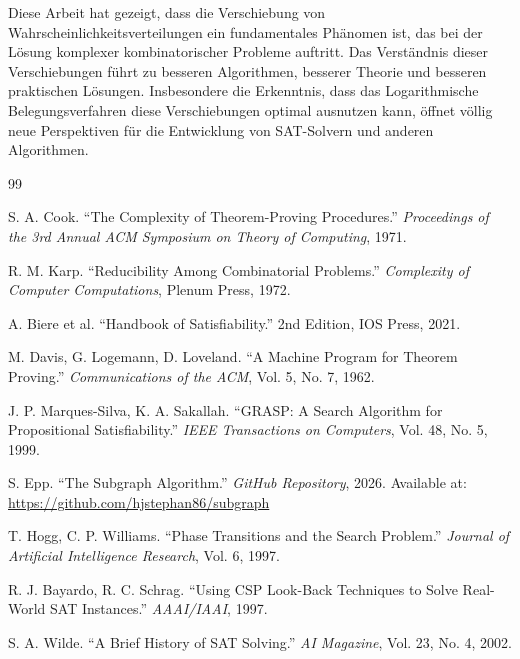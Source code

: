 ﻿\documentclass[a4paper,12pt]{article}
\theoremstyle{definition}
\begin{document}
Diese Arbeit hat gezeigt, dass die Verschiebung von Wahrscheinlichkeitsverteilungen ein fundamentales Phänomen ist, das bei der Lösung komplexer kombinatorischer Probleme auftritt. Das Verständnis dieser Verschiebungen führt zu besseren Algorithmen, besserer Theorie und besseren praktischen Lösungen. Insbesondere die Erkenntnis, dass das Logarithmische Belegungsverfahren diese Verschiebungen optimal ausnutzen kann, öffnet völlig neue Perspektiven für die Entwicklung von SAT-Solvern und anderen Algorithmen.

\begin{thebibliography}{99}

 S. A. Cook. ``The Complexity of Theorem-Proving Procedures.'' \textit{Proceedings of the 3rd Annual ACM Symposium on Theory of Computing}, 1971.

 R. M. Karp. ``Reducibility Among Combinatorial Problems.'' \textit{Complexity of Computer Computations}, Plenum Press, 1972.

 A. Biere et al. ``Handbook of Satisfiability.'' 2nd Edition, IOS Press, 2021.

 M. Davis, G. Logemann, D. Loveland. ``A Machine Program for Theorem Proving.'' \textit{Communications of the ACM}, Vol. 5, No. 7, 1962.

 J. P. Marques-Silva, K. A. Sakallah. ``GRASP: A Search Algorithm for Propositional Satisfiability.'' \textit{IEEE Transactions on Computers}, Vol. 48, No. 5, 1999.

 S. Epp. ``The Subgraph Algorithm.'' \textit{GitHub Repository}, 2026. Available at: \url{https://github.com/hjstephan86/subgraph}

 T. Hogg, C. P. Williams. ``Phase Transitions and the Search Problem.'' \textit{Journal of Artificial Intelligence Research}, Vol. 6, 1997.

 R. J. Bayardo, R. C. Schrag. ``Using CSP Look-Back Techniques to Solve Real-World SAT Instances.'' \textit{AAAI/IAAI}, 1997.

 S. A. Wilde. ``A Brief History of SAT Solving.'' \textit{AI Magazine}, Vol. 23, No. 4, 2002.

\end{thebibliography}
\end{document}

